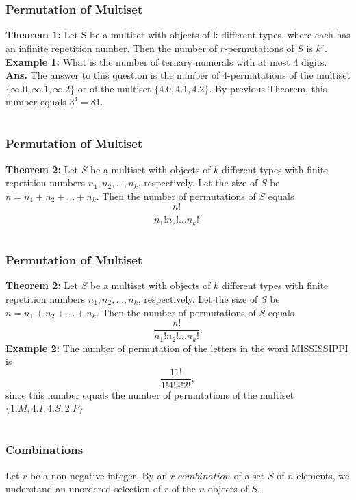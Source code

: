\documentclass{beamer}
\begin{document}
\section{}
 \begin{frame}
\frametitle{Permutation of Multiset}
{\bf Theorem 1:} Let S be a multiset with objects of k different types, where each has an infinite repetition number. Then the number of $r$-permutations of $S$ is $k^r$.\\{\vspace{1cm}}
{\bf Example 1:} What is the number of ternary numerals with at most 4 digits.\\
{\bf Ans. } The answer to this question is the number of 4-permutations of the multiset  $\{ \infty.0, \infty.1, \infty.2 \}$   or of the multiset $ \{ 4.0, 4.1, 4.2 \} $. By previous Theorem, this number equals $3^4=81$.
\end{frame}

\section{}
 \begin{frame}
\frametitle{Permutation of Multiset}
{\bf Theorem 2: }Let $S$ be a multiset with objects of $k$ different types with finite repetition numbers $n_1,n_2,\dots,n_k$, respectively. Let the size of $S$ be $n=n_1+n_2+\dots+n_k$. Then the number of permutations of $S$ equals 
     $$ \frac{n!}{n_1!n_2!\dots n_k!}.$$
     \end{frame}

\section{}
 \begin{frame}
\frametitle{Permutation of Multiset}
{\bf Theorem 2: }Let $S$ be a multiset with objects of $k$ different types with finite repetition numbers $n_1,n_2,\dots,n_k$, respectively. Let the size of $S$ be $n=n_1+n_2+\dots+n_k$. Then the number of permutations of $S$ equals 
     $$ \frac{n!}{n_1!n_2!\dots n_k!}.$$
{\bf Example 2: } The number of  permutation of the letters in the word MISSISSIPPI is
 $$\frac{11!}{1!4!4!2!},$$
 since this number equals the number of permutations of the multiset $\{ 1.M, 4.I, 4.S, 2.P \}$
\end{frame}

\section{}
 \begin{frame}
\frametitle{Combinations}
Let $r$ be a non negative integer. By an $r$-$combination$ of a set $S$ of $n$ elements, we understand an unordered selection of $r$ of the $n$ objects of $S$.
\end{frame}
\end{document}
